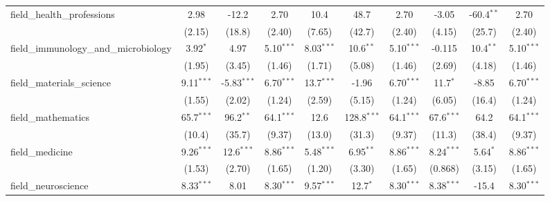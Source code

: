 \begin{tabular}{lccccccccc}
   field\_health\_professions                                  & 2.98          & -12.2         & 2.70          & 10.4           & 48.7           & 2.70          & -3.05         & -60.4$^{**}$  & 2.70\\   
                                                               & (2.15)        & (18.8)        & (2.40)        & (7.65)         & (42.7)         & (2.40)        & (4.15)        & (25.7)        & (2.40)\\   
   field\_immunology\_and\_microbiology                        & 3.92$^{*}$    & 4.97          & 5.10$^{***}$  & 8.03$^{***}$   & 10.6$^{**}$    & 5.10$^{***}$  & -0.115        & 10.4$^{**}$   & 5.10$^{***}$\\   
                                                               & (1.95)        & (3.45)        & (1.46)        & (1.71)         & (5.08)         & (1.46)        & (2.69)        & (4.18)        & (1.46)\\   
   field\_materials\_science                                   & 9.11$^{***}$  & -5.83$^{***}$ & 6.70$^{***}$  & 13.7$^{***}$   & -1.96          & 6.70$^{***}$  & 11.7$^{*}$    & -8.85         & 6.70$^{***}$\\   
                                                               & (1.55)        & (2.02)        & (1.24)        & (2.59)         & (5.15)         & (1.24)        & (6.05)        & (16.4)        & (1.24)\\   
   field\_mathematics                                          & 65.7$^{***}$  & 96.2$^{**}$   & 64.1$^{***}$  & 12.6           & 128.8$^{***}$  & 64.1$^{***}$  & 67.6$^{***}$  & 64.2          & 64.1$^{***}$\\   
                                                               & (10.4)        & (35.7)        & (9.37)        & (13.0)         & (31.3)         & (9.37)        & (11.3)        & (38.4)        & (9.37)\\   
   field\_medicine                                             & 9.26$^{***}$  & 12.6$^{***}$  & 8.86$^{***}$  & 5.48$^{***}$   & 6.95$^{**}$    & 8.86$^{***}$  & 8.24$^{***}$  & 5.64$^{*}$    & 8.86$^{***}$\\   
                                                               & (1.53)        & (2.70)        & (1.65)        & (1.20)         & (3.30)         & (1.65)        & (0.868)       & (3.15)        & (1.65)\\   
   field\_neuroscience                                         & 8.33$^{***}$  & 8.01          & 8.30$^{***}$  & 9.57$^{***}$   & 12.7$^{*}$     & 8.30$^{***}$  & 8.38$^{***}$  & -15.4         & 8.30$^{***}$\\   

\end{tabular}
